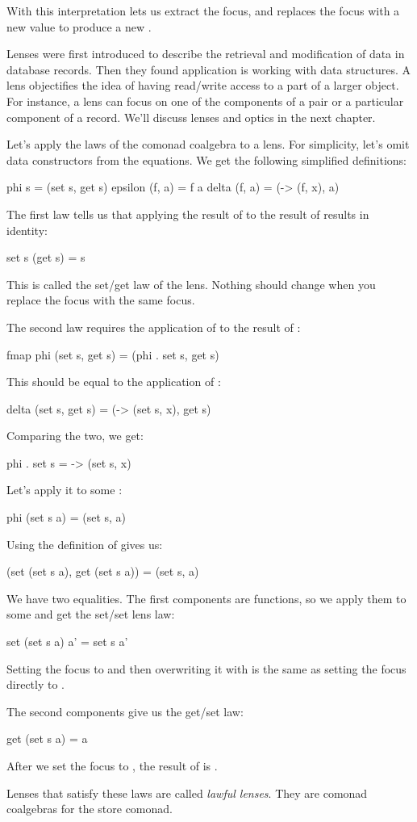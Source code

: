 \documentclass[DaoFP]{subfiles}
\begin{document}
With this interpretation  lets us extract the focus, and  replaces the focus with a new value to produce a new . 

Lenses were first introduced to describe the retrieval and modification of data in database records. Then they found application is working with data structures. A lens objectifies the idea of having read/write access to a part of a larger object. For instance, a lens can focus on one of the components of a pair or a particular component of a record. We'll discuss lenses and optics in the next chapter.

Let's apply the laws of the comonad coalgebra to a lens. For simplicity, let's omit data constructors from the equations. We get the following simplified definitions:
\begin{haskell}
phi s = (set s, get s)
epsilon (f, a) = f a
delta (f, a) = (\x -> (f, x), a)
\end{haskell}

The first law  tells us that applying the result of  to the result of  results in identity:
\begin{haskell}
set s (get  s) = s
\end{haskell}
This is called the set/get law of the lens. Nothing should change when you replace the focus with the same focus.

The second law requires the application of  to the result of :
\begin{haskell}
fmap phi (set s, get s) = (phi . set s, get s)
\end{haskell}
This should be equal to the application of :
\begin{haskell}
delta (set s, get s) = (\x -> (set s, x), get s)
\end{haskell}
Comparing the two, we get:
\begin{haskell}
phi . set s = \x -> (set s, x)
\end{haskell}
Let's apply it to some :
\begin{haskell}
phi (set s a) = (set s, a)
\end{haskell}
Using the definition of  gives us:
\begin{haskell}
(set (set s a), get (set s a)) = (set s, a)
\end{haskell}
We have two equalities. The first components are functions, so we apply them to some  and get the set/set lens law:
\begin{haskell}
set (set s a) a' = set s a'
\end{haskell}
Setting the focus to  and then overwriting it with  is the same as setting the focus directly to .

The second components give us the get/set law:
\begin{haskell}
get (set s a) = a
\end{haskell}
After we set the focus to , the result of  is .

Lenses that satisfy these laws are called \emph{lawful lenses}. They are comonad coalgebras for the store comonad.
\end{document}

